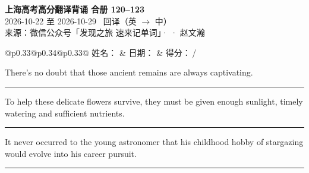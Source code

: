 \documentclass[11pt,a4paper]{article}
\newcommand{\num}[1]{\makebox[1.9em][r]{#1.}\hspace{0.3em}}
\newcommand{\wline}{\noindent\rule{\linewidth}{0.4pt}}
\begin{document}
\pagestyle{plain}
\begin{center}
{\LARGE\bfseries 上海高考高分翻译背诵 \quad 合册 120–123}\\[0.25em]
{\large 2026-10-22 至 2026-10-29 \quad\ 回译（英 $\to$ 中）}\\[0.35em]
{\footnotesize 来源：微信公众号「发现之旅 速来记单词」·  · 赵文瀚}
\end{center}

\vspace{0.4em}
\noindent\begin{tabular}{@{}p{0.33\textwidth}@{}p{0.34\textwidth}@{}p{0.33\textwidth}@{}}
姓名：\underline{\hspace{2.0cm}} & 日期：\underline{\hspace{2.0cm}} & 得分：\underline{\hspace{1.4cm}}\,/ \\
\end{tabular}

\vspace{0.5em}

\vspace{0.8em}
\vspace{0.35em}\vspace{0.15em}

\begin{minipage}{\linewidth}

\num{1}There’s no doubt that those ancient remains are always captivating.

\vspace{0.25em}

\wline

\end{minipage}

\begin{minipage}{\linewidth}

\num{2}To help these delicate flowers survive, they must be given enough sunlight, timely watering and sufficient nutrients.

\vspace{0.25em}

\wline

\end{minipage}

\begin{minipage}{\linewidth}

\num{3}It never occurred to the young astronomer that his childhood hobby of stargazing would evolve into his career pursuit.

\vspace{0.25em}

\wline

\end{minipage}
\end{document}
